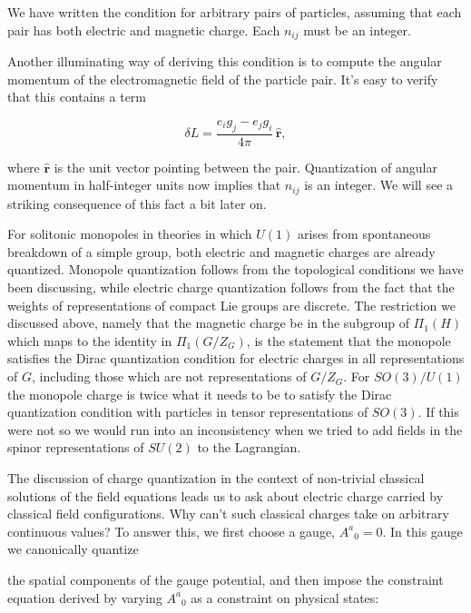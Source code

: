 We have written the condition for arbitrary pairs of particles, assuming that
each pair has both electric and magnetic charge. Each $n_{ij}$ must be an
integer.

Another illuminating way of deriving this condition is to compute the angular
momentum of the electromagnetic field of the particle pair. It's easy to verify
that this contains a term

\[
  \delta L=\frac{e_i g_j-e_jg_i}{4\pi}\,\widehat{\mathbf r},
\]

where $\widehat{\mathbf r}$ is the unit vector pointing between the pair. Quantization of
angular momentum in half-integer units now implies that $n_{ij}$ is an integer.
We will see a striking consequence of this fact a bit later on.

For solitonic monopoles in theories in which $U(1)$ arises from spontaneous
breakdown of a simple group, both electric and magnetic charges are already
quantized. Monopole quantization follows from the topological conditions we have
been discussing, while electric charge quantization follows from the fact that
the weights of representations of compact Lie groups are discrete. The
restriction we discussed above, namely that the magnetic charge be in the
subgroup of $\Pi_1(H)$ which maps to the identity in $\Pi_1(G/Z_G)$, is the
statement that the monopole satisfies the Dirac quantization condition for
electric charges in all representations of $G$, including those which are not
representations of $G/Z_G$. For $SO(3)/U(1)$ the monopole charge is twice what
it needs to be to satisfy the Dirac quantization condition with particles in
tensor representations of $SO(3)$. If this were not so we would run into an
inconsistency when we tried to add fields in the spinor representations of
$SU(2)$ to the Lagrangian.

The discussion of charge quantization in the context of non-trivial classical
solutions of the field equations leads us to ask about electric charge carried by
classical field configurations. Why can't such classical charges take on
arbitrary continuous values? To answer this, we first choose a gauge, $A^a{}_{0}=0$.
In this gauge we canonically quantize

the spatial components of the gauge potential, and then impose the constraint
equation derived by varying $A^a{}_{0}$ as a constraint on physical states:

